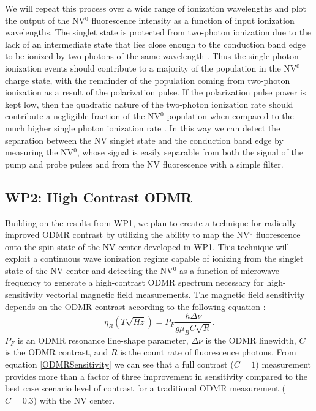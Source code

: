 \documentclass[11pt]{article}
\begin{document}
We will repeat this process over a wide range of ionization wavelengths and plot the output of the NV$^0$
fluorescence intensity as a function of input ionization wavelengths.  The singlet state is protected
from two-photon ionization due to the lack of an intermediate state that lies close enough to the
conduction band edge to be ionized by two photons of the same wavelength \cite{Shields2015}.  Thus the
single-photon
ionization events should contribute to a majority of the population in the NV$^0$ charge state, with the
remainder of the population coming from two-photon ionization as a result of the polarization pulse. 
If the polarization pulse power is kept low, then the quadratic nature of the two-photon ionization
rate should contribute a negligible fraction of the NV$^0$ population when compared to the much higher
single photon ionization rate \cite{Aslam2013}.  In this way we can detect the separation between the NV singlet
state and the conduction band edge by measuring the NV$^0$, whose signal is easily separable from both the
signal of the pump and probe pulses and from the NV fluorescence with a simple filter.

\subsection{WP2: High Contrast ODMR}
Building on the results from WP1, we plan to create a technique for radically improved ODMR contrast by
utilizing the ability to map the NV$^0$ fluorescence onto the spin-state of the NV center developed in
WP1.  This technique will exploit a continuous wave ionization regime capable of ionizing from the
singlet state of the NV center and detecting the NV$^0$ as a function of microwave frequency to generate a
high-contrast ODMR spectrum necessary for high-sensitivity vectorial magnetic field measurements.  The
magnetic field sensitivity depends on the ODMR contrast according to the following equation
\cite{Dreau2011}: 
\begin{equation}
\eta_{B} (T\sqrt{Hz}) = P_F\frac{h\Delta\nu}{g\mu_B C\sqrt{R}}.
\label{ODMRSensitivity}
\end{equation}
$P_F$ is an ODMR resonance line-shape parameter, $\Delta\nu$ is the ODMR linewidth,
$C$ is the ODMR contrast, and $R$ is the count rate of fluorescence photons.  From equation \ref{ODMRSensitivity} we can see
that a full contrast ($C=1$) measurement provides more than a factor of three improvement in sensitivity
compared to the best case scenario level of contrast for a traditional ODMR measurement ($C=0.3$) with
the NV center.
\end{document}
